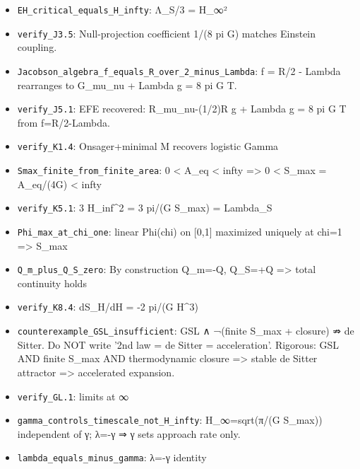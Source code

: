 \documentclass[11pt,a4paper]{article}
\theoremstyle{remark}\newtheorem*{caution}{Caution}
\begin{document}
\begin{itemize}
\item [\textcolor{green!50!black}{PASS}] \texttt{EH\_critical\_equals\_H\_infty}: Λ\_S/3 = H\_∞²
\item [\textcolor{green!50!black}{PASS}] \texttt{verify\_J3.5}: Null-projection coefficient 1/(8 pi G) matches Einstein coupling.
\item [\textcolor{green!50!black}{PASS}] \texttt{Jacobson\_algebra\_f\_equals\_R\_over\_2\_minus\_Lambda}: f = R/2 - Lambda rearranges to G\_mu\_nu + Lambda g = 8 pi G T.
\item [\textcolor{green!50!black}{PASS}] \texttt{verify\_J5.1}: EFE recovered: R\_mu\_nu-(1/2)R g + Lambda g = 8 pi G T from f=R/2-Lambda.
\item [\textcolor{green!50!black}{PASS}] \texttt{verify\_K1.4}: Onsager+minimal M recovers logistic Gamma
\item [\textcolor{green!50!black}{PASS}] \texttt{Smax\_finite\_from\_finite\_area}: 0 < A\_eq < infty => 0 < S\_max = A\_eq/(4G) < infty
\item [\textcolor{green!50!black}{PASS}] \texttt{verify\_K5.1}: 3 H\_inf^2 = 3 pi/(G S\_max) = Lambda\_S
\item [\textcolor{green!50!black}{PASS}] \texttt{Phi\_max\_at\_chi\_one}: linear Phi(chi) on [0,1] maximized uniquely at chi=1 => S\_max
\item [\textcolor{green!50!black}{PASS}] \texttt{Q\_m\_plus\_Q\_S\_zero}: By construction Q\_m=-Q, Q\_S=+Q => total continuity holds
\item [\textcolor{green!50!black}{PASS}] \texttt{verify\_K8.4}: dS\_H/dH = -2 pi/(G H^3)
\item [\textcolor{green!50!black}{PASS}] \texttt{counterexample\_GSL\_insufficient}: GSL ∧ ¬(finite S\_max + closure) ⇏ de Sitter. Do NOT write '2nd law = de Sitter = acceleration'. Rigorous: GSL AND finite S\_max AND thermodynamic closure => stable de Sitter attractor => accelerated expansion.
\item [\textcolor{green!50!black}{PASS}] \texttt{verify\_GL.1}: limits at ∞
\item [\textcolor{green!50!black}{PASS}] \texttt{gamma\_controls\_timescale\_not\_H\_infty}: H\_∞=sqrt(π/(G S\_max)) independent of γ; λ=-γ ⇒ γ sets approach rate only.
\item [\textcolor{green!50!black}{PASS}] \texttt{lambda\_equals\_minus\_gamma}: λ=-γ identity
\end{itemize}
\end{document}
